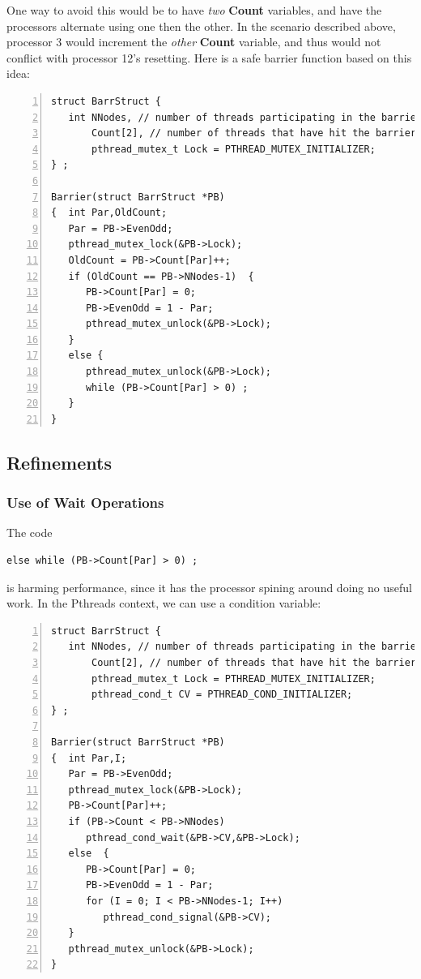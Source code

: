 One way to avoid this would be to have \textit{two} {\bf Count}
variables, and have the processors alternate using one then the other.
In the scenario described above, processor 3 would increment the
\textit{other} {\bf Count} variable, and thus would not conflict with
processor 12's resetting.  Here is a safe barrier function based on this
idea:

\begin{samepage}
\begin{Verbatim}[fontsize=\relsize{-2},numbers=left]
struct BarrStruct {
   int NNodes, // number of threads participating in the barrier
       Count[2], // number of threads that have hit the barrier so far
       pthread_mutex_t Lock = PTHREAD_MUTEX_INITIALIZER;
} ;

Barrier(struct BarrStruct *PB)
{  int Par,OldCount;
   Par = PB->EvenOdd;
   pthread_mutex_lock(&PB->Lock);
   OldCount = PB->Count[Par]++;
   if (OldCount == PB->NNodes-1)  {
      PB->Count[Par] = 0;
      PB->EvenOdd = 1 - Par;
      pthread_mutex_unlock(&PB->Lock);
   }
   else {
      pthread_mutex_unlock(&PB->Lock);
      while (PB->Count[Par] > 0) ;
   }
}
\end{Verbatim}
\end{samepage}

\subsection{Refinements}

\subsubsection{Use of Wait Operations}

The code

\begin{Verbatim}[fontsize=\relsize{-2}]
else while (PB->Count[Par] > 0) ;
\end{Verbatim}

is harming performance, since it has the processor spining around doing
no useful work.  In the Pthreads context, we can use a condition
variable:  

\begin{samepage}
\begin{Verbatim}[fontsize=\relsize{-2},numbers=left]
struct BarrStruct {
   int NNodes, // number of threads participating in the barrier
       Count[2], // number of threads that have hit the barrier so far
       pthread_mutex_t Lock = PTHREAD_MUTEX_INITIALIZER;
       pthread_cond_t CV = PTHREAD_COND_INITIALIZER;
} ;

Barrier(struct BarrStruct *PB)
{  int Par,I;
   Par = PB->EvenOdd;
   pthread_mutex_lock(&PB->Lock);
   PB->Count[Par]++;
   if (PB->Count < PB->NNodes) 
      pthread_cond_wait(&PB->CV,&PB->Lock);
   else  {
      PB->Count[Par] = 0;
      PB->EvenOdd = 1 - Par;
      for (I = 0; I < PB->NNodes-1; I++)
         pthread_cond_signal(&PB->CV);
   }
   pthread_mutex_unlock(&PB->Lock);
}
\end{Verbatim}
\end{samepage}

